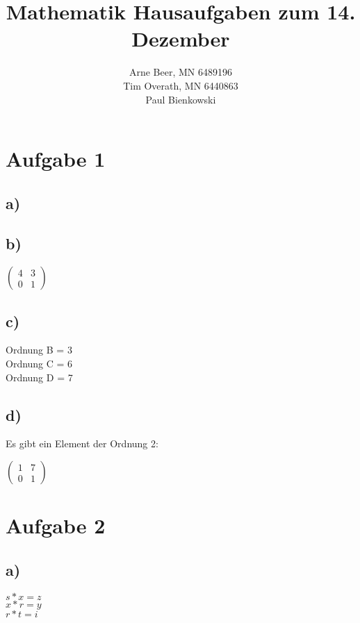 \documentclass{article}
\title{Mathematik Hausaufgaben zum 14. Dezember}
\author{Arne Beer, MN 6489196 \\
 Tim Overath, MN 6440863\\
 Paul Bienkowski}
\begin{document}
\maketitle

\section*{Aufgabe 1}

	\subsection*{a)}



	\subsection*{b)}

	$\begin{pmatrix} 4&3 \\ 0&1 \end{pmatrix}$

	\subsection*{c)}

		Ordnung B = 3\\
		Ordnung C = 6\\
		Ordnung D = 7\\

	\subsection*{d)}

	Es gibt ein Element der Ordnung 2:

	$ \begin{pmatrix} 1&7 \\ 0&1 	\end{pmatrix}$

\section*{Aufgabe 2}

	\subsection*{a)}

	$s*x=z$\\
	$x*r=y$\\
	$r*t=i$\\
\end{document}
